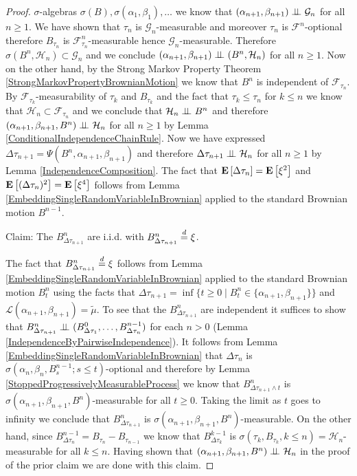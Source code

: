 \begin{proof}
$\sigma$-algebras $\sigma(B), \sigma(\alpha_1,\beta_1), \dotsc$ we know that
$(\alpha_{n+1}, \beta_{n+1}) \perp \! \! \! \perp_{} \mathcal{G}_n$ for all
$n \geq 1$.  We have shown that $\tau_n$ is $\mathcal{G}_n$-measurable
and moreover $\tau_n$ is $\mathcal{F}^n$-optional therefore
$B_{\tau_n}$ is $\mathcal{F}^n_{\tau_n}$-measurable hence
$\mathcal{G}_n$-measurable.  Therefore $\sigma(B^n, \mathcal{H}_n)
\subset \mathcal{G}_n$ and we conclude $(\alpha_{n+1},
  \beta_{n+1}) \perp \! \! \! \perp_{} (B^n, \mathcal{H}_n)$ for all
$n \geq 1$.  Now on the other hand, by the Strong Markov Property
Theorem \ref{StrongMarkovPropertyBrownianMotion} we know that $B^n$ is independent
of $\mathcal{F}_{\tau_n}$.  By $\mathcal{F}_{\tau_k}$-measurability
of $\tau_k$ and $B_{\tau_k}$ and the fact that $\tau_k \leq \tau_n$
for $k \leq n$ we know that $\mathcal{H}_n \subset
\mathcal{F}_{\tau_n}$ and we conclude that
$\mathcal{H}_n \perp \! \! \! \perp_{} B^n$ and therefore $(\alpha_{n+1},
  \beta_{n+1}, B^n) \perp \! \! \! \perp_{} \mathcal{H}_n$ for all
$n \geq 1$ by Lemma \ref{ConditionalIndependenceChainRule}.  Now we
have expressed $\Delta \tau_{n+1} = \Psi(B^n, \alpha_{n+1},
\beta_{n+1})$ and therefore $\Delta \tau_{n+1} \perp \! \! \! \perp_{} \mathcal{H}_n$ for all
$n \geq 1$ by Lemma \ref{IndependenceComposition}.  The fact that
$\textbf{E}\left[\Delta \tau_n\right] = \textbf{E}\left[\xi^2\right]$ and
$\textbf{E}\left[(\Delta \tau_n)^2\right] = \textbf{E}\left[\xi^4\right]$ follows from Lemma
\ref{EmbeddingSingleRandomVariableInBrownian} applied to the standard
Brownian motion $B^{n-1}$.

Claim: The $B^n_{\Delta \tau_{n+1}}$ are i.i.d. with $B^n_{\Delta \tau_{n+1}}
\overset{d}= \xi$.

The fact that $B^n_{\Delta \tau_{n+1}} \overset{d}= \xi$ follows from Lemma
\ref{EmbeddingSingleRandomVariableInBrownian} applied to the standard
Brownian motion $B^n_t$ using the facts that $\Delta
\tau_{n+1} = \inf \lbrace t \geq 0 \mid B^n_t \in \lbrace
\alpha_{n+1}, \beta_{n+1}\rbrace \rbrace$ and
$\mathcal{L}(\alpha_{n+1},\beta_{n+1}) = \tilde{\mu}$.  To see that
the $B^n_{\Delta \tau_{n+1}}$ are independent it suffices to show that 
$B^n_{\Delta \tau_{n+1}} \perp \! \! \! \perp_{} (B^0_{\Delta \tau_1}, \dotsc,
  B^{n-1}_{\Delta \tau_n})$ for each $n > 0$ (Lemma \ref{IndependenceByPairwiseIndependence}).
It follows from Lemma \ref{EmbeddingSingleRandomVariableInBrownian}  that $\Delta \tau_n$ is $\sigma(\alpha_n,
\beta_n, B^{n-1}_s ; s\leq t)$-optional and therefore by Lemma
\ref{StoppedProgressivelyMeasurableProcess} we know that
$B^{n}_{\Delta \tau_{n+1}  \wedge t}$ is $\sigma(\alpha_{n+1}, \beta_{n+1},
B^{n})$-measurable for all $t \geq 0$.  Taking the limit as $t$ goes
to infinity we conclude that $B^{n}_{\Delta \tau_{n+1}}$ is $\sigma(\alpha_{n+1}, \beta_{n+1},
B^{n})$-measurable.  On the other hand, since 
$B^{n-1}_{\Delta  \tau_n} = B_{\tau_n} - B_{\tau_{n-1}}$ we know that 
$B^{k-1}_{\Delta  \tau_k}$ is $\sigma(\tau_k, B_{\tau_k}, k \leq
n)=\mathcal{H}_{n}$-measurable for all $k \leq n$.  Having shown that
$(\alpha_{n+1}, \beta_{n+1}, B^{n}) \perp \! \! \! \perp_{} \mathcal{H}_{n}$
in the proof of the prior claim 
we are done with this claim.


\end{proof}
